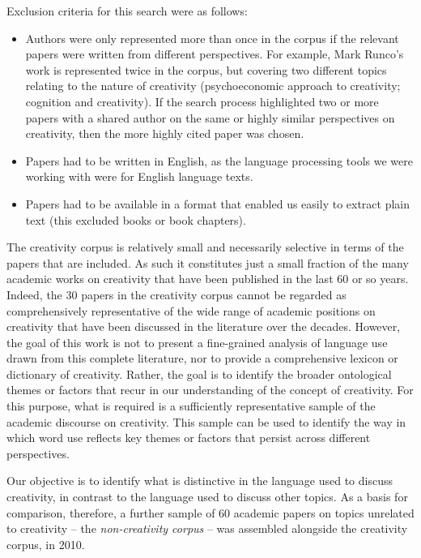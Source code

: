 \documentclass[10pt,letterpaper]{article}
\begin{document}
Exclusion criteria for this search were as follows: 
\begin{itemize}
\item Authors were only represented more than once in the corpus if the relevant papers were written from different perspectives. For example, Mark Runco's work is represented twice in the corpus, but covering two different topics relating to the nature of creativity (psychoeconomic approach to creativity; cognition and creativity). If the search process highlighted two or more papers with a shared author on the same or highly similar perspectives on creativity, then the more highly cited paper was chosen. 
\item Papers had to be written in English, as the language processing tools we were working with were for English language texts.
\item Papers had to be available in a format that enabled us easily to extract plain text (this excluded books or book chapters).
\end{itemize}

The creativity corpus is relatively small and necessarily selective  in terms of the papers that are included. As such it constitutes just a small fraction of the many academic works on creativity that have been published in the last 60 or so years. Indeed, the 30 papers in the creativity corpus cannot be regarded as comprehensively representative of the wide range of academic positions on creativity that have been discussed in the literature over the decades. However, the goal of this work is not to present a fine-grained analysis of language use drawn from this complete literature, nor to provide a comprehensive lexicon or dictionary of creativity. Rather, the goal is to identify the broader ontological themes or factors that recur in our understanding of the concept of creativity. For this purpose, what is required is a sufficiently representative sample of the academic discourse on creativity. This sample can be used to identify the way in which word use reflects key themes or factors that persist across different perspectives.

Our objective is to identify what is distinctive in the language used to discuss creativity, in contrast to the language used to discuss other topics. As a basis for comparison, therefore, a further sample of 60 academic papers on topics unrelated to creativity -- the {\em non-creativity corpus} -- was assembled alongside the creativity corpus, in 2010. 

\vspace{0.25cm}
\begin{center}
\end{center}
\vspace{0.25cm}
\end{document}
